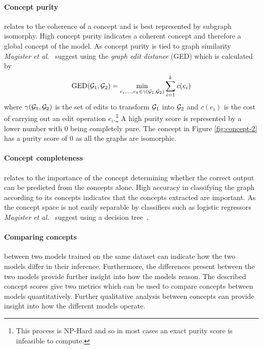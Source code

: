 \paragraph{Concept purity}
relates to the coherence of a concept and is best represented by subgraph isomorphy.
High concept purity indicates a coherent concept and therefore a global concept of the model.
As concept purity is tied to graph similarity \textit{Magister et al.}~\cite{magister2021gcexplainer} suggest using the \emph{graph edit distance} (GED) which is calculated by 
\begin{equation}
    \label{eq:GED}
    \operatorname{GED}({\mathcal{G}}_1, {\mathcal{G}}_2) = \underset{e_i,...,e_k \in \gamma({\mathcal{G}}_1, {\mathcal{G}}_2)}{\operatorname{min}} \sum_{i=1}^{k}c(e_i)
\end{equation}
where $\gamma({\mathcal{G}}_1, {\mathcal{G}}_2)$ is the set of edits to transform ${\mathcal{G}}_1$ into ${\mathcal{G}}_2$ and $c(e_i)$ is the cost of carrying out an edit operation $e_i$.\footnote{This process is NP-Hard and so in most cases an exact purity score is infeasible to compute.}
A high purity score is represented by a lower number with 0 being completely pure.
The concept in Figure \ref{fig:concept-2} has a purity score of 0 as all the graphs are isomorphic.

\paragraph{Concept completeness}
relates to the importance of the concept determining whether the correct output can be predicted from the concepts alone.
High accuracy in classifying the graph according to its concepts indicates that the concepts extracted are important.
As the concept space is not easily separable by classifiers such as logistic regressors \textit{Magister et al.}~\cite{magister2021gcexplainer} suggest using a decision tree~\cite{kazhdan2020now}.



\paragraph{Comparing concepts} between two models trained on the same dataset can indicate how the two models differ in their inference.
Furthermore, the differences present between the two models provide further insight into how the models reason.
The described concept scores give two metrics which can be used to compare concepts between models quantitatively.
Further qualitative analysis between concepts can provide insight into how the different models operate.

